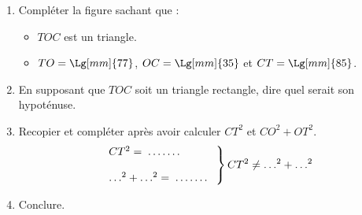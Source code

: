 \begin{exercice*}
    \begin{enumerate}
        \item Compléter la figure sachant que :
        \begin{itemize}
            \item $TOC$ est un triangle.
            \item $TO=\Lg[mm]{77}$, $OC=\Lg[mm]{35}$ et $CT=\Lg[mm]{85}$.
        \end{itemize}

        \medskip
        \item En supposant que $TOC$ soit un triangle rectangle, dire quel serait son hypoténuse.
        \item Recopier et compléter après avoir calculer $CT^2$ et $CO^2+OT^2$.
            $$\left.\begin{array}{l}
            CT^2=\makebox[0.1\linewidth]{\dotfill}\\
            \\
            \ldots^2+\ldots^2=\makebox[0.1\linewidth]{\dotfill}\\
            \end{array}
            \right\rbrace CT^2\neq \ldots^2+\ldots^2$$
        \item Conclure.
    \end{enumerate}
\end{exercice*}

